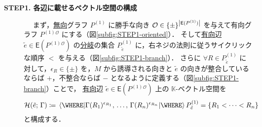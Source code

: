 \documentclass[TQFT_main]{subfiles}
\begin{document}
\begin{description}
    \item[\textbf{STEP1. 各辺に載せるベクトル空間の構成}]　
    \label{TV:STEP1}
    まず，\underline{無向}グラフ $P^{(1)}$ に勝手な向き $\mathcal{O} \in \{\pm\}^{\abs{\mathsf{E}(P^{(1)})}}$ を与えて有向グラフ $P^{(1)}{}^{\mathcal{O}}$ にする（図\ref{subfig:STEP1-oriented}）．
    そして\underline{有向}辺 $\tilde{e} \in \mathsf{E}(P^{(1)}{}^{\mathcal{O}})$ の\hyperref[def:polyhedron]{分岐}の集合 $P^{(1)}_{\tilde{e}}$ に，右ネジの法則に従うサイクリックな順序 $<$ を与える（図\ref{subfig:STEP1-branch}）．
    さらに $\forall R \in P_{\tilde{e}}^{(1)}$ に対して，$\epsilon_R \in \{\pm\}$ を，$M$ から誘導される向きと $\tilde{e}$ の向きが整合しているならば $+$，不整合ならば $-$ となるように定義する（図\ref{subfig:STEP1-branch}）ことで，
    \underline{有向}辺 $\tilde{e} \in \mathsf{E}(P^{(1)}{}^{\mathcal{O}})$ 上の $\mathbb{K}$-ベクトル空間を
    \begin{align}
        \mathcal{H}(\tilde{e};\, \Gamma) \coloneqq \expval{\Gamma(R_1)^{\epsilon_{R_1}},\, \dots,\, \Gamma(R_n)^{\epsilon_{R_n}}} \WHERE P_{\tilde{e}}^{(1)} = \{R_1 < \cdots < R_n\}
    \end{align}
    と構成する．

    \begin{figure}[H]
        \centering
        \begin{subfigure}{0.4\columnwidth}
            \centering
\end{subfigure}
\end{figure}
\end{description}
\end{document}
